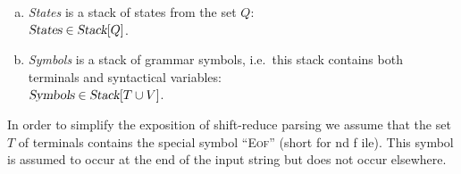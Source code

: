\begin{enumerate}[(a)]
\item \textsl{States} is a stack of states from the set $Q$:
      \\[0.2cm]
      \hspace*{1.3cm}
      $\textsl{States} \in \textsl{Stack}[Q]$.
\item \textsl{Symbols} is a stack of grammar symbols, i.e.~this stack contains both terminals and syntactical
      variables:
      \\[0.2cm]
      \hspace*{1.3cm}
      $\textsl{Symbols} \in \textsl{Stack}[T \cup V]$.
\end{enumerate}
In order to simplify the exposition of shift-reduce parsing we assume that the set $T$ of terminals contains
the special symbol ``\textsc{Eof}'' (short for nd f ile).
This symbol is assumed to occur at the end of the input string but does not occur elsewhere.


